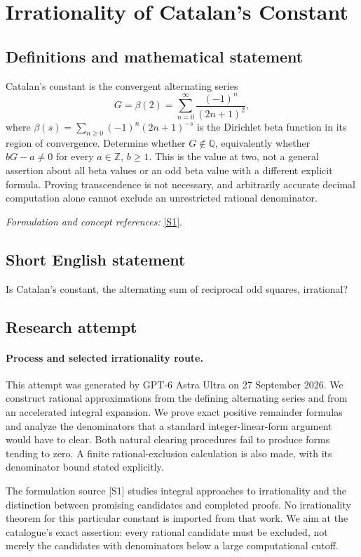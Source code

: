 \documentclass[11pt]{article}
\begin{document}
\section*{\texorpdfstring{Irrationality of Catalan’s Constant}{Irrationality of Catalan’s Constant}}\label{30005093}
\subsection{Definitions and mathematical statement}
Catalan's constant is the convergent alternating series
\[
 G=\beta(2)=\sum_{n=0}^{\infty}\frac{(-1)^n}{(2n+1)^2},
\]
where $\beta(s)=\sum_{n\ge0}(-1)^n(2n+1)^{-s}$ is the Dirichlet beta function in its region of convergence. Determine whether $G\notin{\mathbb{Q}}$, equivalently whether $bG-a\ne0$ for every $a\in{\mathbb{Z}}$, $b\ge1$. This is the value at two, not a general assertion about all beta values or an odd beta value with a different explicit formula. Proving transcendence is not necessary, and arbitrarily accurate decimal computation alone cannot exclude an unrestricted rational denominator.
\par\smallskip\textit{Formulation and concept references:} \href{https://arxiv.org/abs/2101.08308}{[S1]}.

\subsection{Short English statement}
Is Catalan's constant, the alternating sum of reciprocal odd squares, irrational?
\subsection{Research attempt}
\paragraph{Process and selected irrationality route.}
This attempt was generated by GPT-6 Astra Ultra on 27 September 2026. We construct rational approximations from the defining alternating series and from an accelerated integral expansion. We prove exact positive remainder formulas and analyze the denominators that a standard integer-linear-form argument would have to clear. Both natural clearing procedures fail to produce forms tending to zero. A finite rational-exclusion calculation is also made, with its denominator bound stated explicitly.

The formulation source [S1] studies integral approaches to irrationality and the distinction between promising candidates and completed proofs. No irrationality theorem for this particular constant is imported from that work. We aim at the catalogue's exact assertion: every rational candidate must be excluded, not merely the candidates with denominators below a large computational cutoff.
\end{document}
